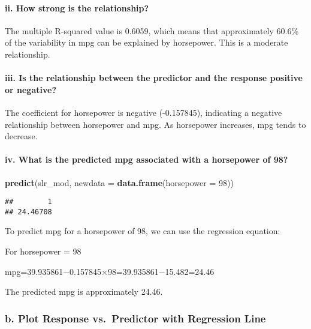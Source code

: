 \documentclass[
]{article}
\newenvironment{Shaded}{\begin{snugshade}}{\end{snugshade}}
\newcommand{\AttributeTok}[1]{\textcolor[rgb]{0.13,0.29,0.53}{#1}}
\newcommand{\DecValTok}[1]{\textcolor[rgb]{0.00,0.00,0.81}{#1}}
\newcommand{\FunctionTok}[1]{\textcolor[rgb]{0.13,0.29,0.53}{\textbf{#1}}}
\newcommand{\NormalTok}[1]{#1}
\begin{document}
\paragraph{ii. How strong is the
relationship?}\label{ii.-how-strong-is-the-relationship}

The multiple R-squared value is 0.6059, which means that approximately
60.6\% of the variability in mpg can be explained by horsepower. This is
a moderate relationship.

\paragraph{iii. Is the relationship between the predictor and the
response positive or
negative?}\label{iii.-is-the-relationship-between-the-predictor-and-the-response-positive-or-negative}

The coefficient for horsepower is negative (-0.157845), indicating a
negative relationship between horsepower and mpg. As horsepower
increases, mpg tends to decrease.

\paragraph{iv. What is the predicted mpg associated with a horsepower of
98?}\label{iv.-what-is-the-predicted-mpg-associated-with-a-horsepower-of-98}

\begin{Shaded}
\begin{Highlighting}[]
\FunctionTok{predict}\NormalTok{(slr\_mod, }\AttributeTok{newdata =} \FunctionTok{data.frame}\NormalTok{(}\AttributeTok{horsepower =} \DecValTok{98}\NormalTok{))}
\end{Highlighting}
\end{Shaded}

\begin{verbatim}
##        1 
## 24.46708
\end{verbatim}

To predict mpg for a horsepower of 98, we can use the regression
equation:

For horsepower = 98

mpg=39.935861−0.157845×98=39.935861−15.482=24.46

The predicted mpg is approximately 24.46.

\subsubsection{b. Plot Response vs.~Predictor with Regression
Line}\label{b.-plot-response-vs.-predictor-with-regression-line}
\end{document}

